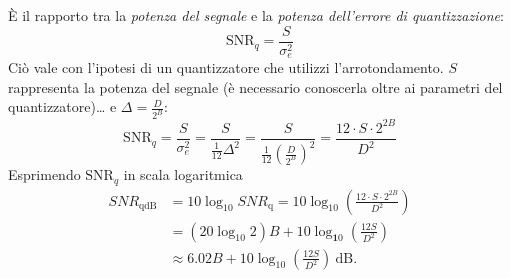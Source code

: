 \documentclass[
]{article}
\begin{document}
\begin{enumerate}
  È il rapporto tra la \emph{potenza del segnale} e la \emph{potenza
  dell'errore di quantizzazione}: \[
  \text{SNR}_q = \frac{S}{\sigma^2_e}
  \] Ciò vale con l'ipotesi di un quantizzatore che utilizzi
  l'arrotondamento. \(S\) rappresenta la potenza del segnale (è
  necessario conoscerla oltre ai parametri del quantizzatore)\ldots{} e
  \(\Delta=\frac{D}{2^{B}}\): \[
  \text{SNR}_{q}=\frac{S}{\sigma_e^2}=\frac{S}{\frac{1}{12}\Delta^2}=\frac{S}{\frac{1}{12}(\frac{D}{2^B})^2}=\frac{12\cdot S\cdot2^{2B}}{D^2}
  \] Esprimendo \(\text{SNR}_{q}\) in scala logaritmica \begin{align*}
  SNR_{\mathrm{qdB}} &=10\log_{10}SNR_{\mathrm{q}}=10\log_{10}\left(\frac{12\cdot S\cdot2^{2B}}{D^{2}}\right) \\
  &=(20 \log_{10}2)B+10\log_{\mathbf{1}0}\left(\frac{12S}{D^2}\right) \\
  &\approx6.02B+10\log_{10}\left(\frac{12S}{D^2}\right)\ \mathrm{dB}. 
  \end{align*}
\end{enumerate}
\end{document}
